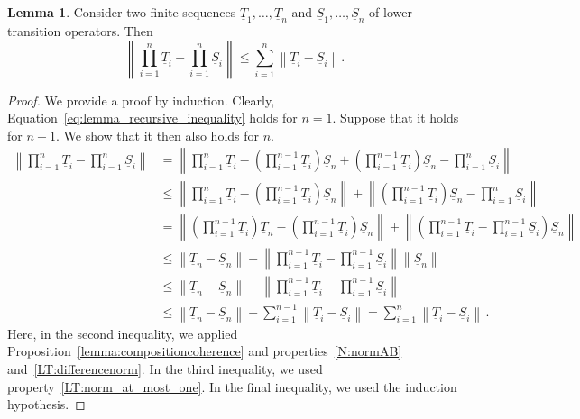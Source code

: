 \documentclass[10pt,a4paper]{paper}
\theoremstyle{definition}
\newtheorem{lemma}[theorem]{Lemma}
\newcommand{\norm}[1]{\left\lVert #1 \right\rVert}
\begin{document}
\begin{lemma}\label{lemma:recursive_lower_trans}
Consider two finite sequences $\underline{T}_1,\ldots,\underline{T}_n$ and $\underline{S}_1,\ldots,\underline{S}_n$ of lower transition operators. Then
\begin{equation}\label{eq:lemma_recursive_inequality}
\norm{\prod_{i=1}^n\underline{T}_i - \prod_{i=1}^n\underline{S}_i} \leq \sum_{i=1}^n \norm{\underline{T}_i - \underline{S}_i}.
\end{equation}
\end{lemma}
\begin{proof}
We provide a proof by induction. Clearly, Equation~\eqref{eq:lemma_recursive_inequality} holds for $n=1$. Suppose that it holds for $n-1$. We show that it then also holds for $n$.
\begin{align*}
\norm{\prod_{i=1}^n\underline{T}_i - \prod_{i=1}^n\underline{S}_i} &= \norm{\prod_{i=1}^n\underline{T}_i - \left(\prod_{i=1}^{n-1}\underline{T}_i\right)\underline{S}_n + \left(\prod_{i=1}^{n-1}\underline{T}_i\right)\underline{S}_n - \prod_{i=1}^n\underline{S}_i} \\
 &\leq \norm{\prod_{i=1}^n\underline{T}_i - \left(\prod_{i=1}^{n-1}\underline{T}_i\right)\underline{S}_n} + \norm{\left(\prod_{i=1}^{n-1}\underline{T}_i\right)\underline{S}_n - \prod_{i=1}^n\underline{S}_i} \\
 &= \norm{\left(\prod_{i=1}^{n-1}\underline{T}_i\right)\underline{T}_n - \left(\prod_{i=1}^{n-1}\underline{T}_i\right)\underline{S}_n} + \norm{\left(\prod_{i=1}^{n-1}\underline{T}_i - \prod_{i=1}^{n-1}\underline{S}_i\right)\underline{S}_n} \\
 &\leq \norm{\underline{T}_n - \underline{S}_n} + \norm{\prod_{i=1}^{n-1}\underline{T}_i - \prod_{i=1}^{n-1}\underline{S}_i}\norm{\underline{S}_n} \\
 &\leq \norm{\underline{T}_n - \underline{S}_n} + \norm{\prod_{i=1}^{n-1}\underline{T}_i - \prod_{i=1}^{n-1}\underline{S}_i} \\
 &\leq \norm{\underline{T}_n - \underline{S}_n} + \sum_{i=1}^{n-1}\norm{\underline{T}_i - \underline{S}_i} = \sum_{i=1}^{n}\norm{\underline{T}_i - \underline{S}_i}\,.
\end{align*}
Here, in the second inequality, we applied Proposition~\ref{lemma:compositioncoherence} and properties~\ref{N:normAB} and~\ref{LT:differencenorm}. In the third inequality, we used property~\ref{LT:norm_at_most_one}. In the final inequality, we used the induction hypothesis.
\end{proof}
\end{document}
